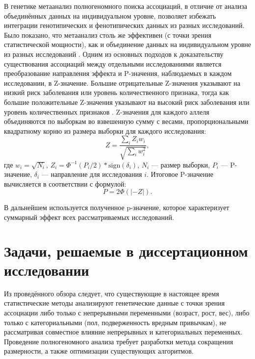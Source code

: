 В генетике метаанализ полногеномного поиска ассоциаций, в отличие от анализа объединённых данных на индивидуальном уровне, позволяет избежать интеграции генотипических и фенотипических данных из разных исследований. Было показано, что метаанализ столь же эффективен (с точки зрения статистической мощности), как и объединение данных на индивидуальном уровне из разных исследований \autocite{Lin2009}. Одним из основных подходов к доказательству существования ассоциаций между отдельными исследованиями является преобразование направления эффекта и P-значения, наблюдаемых в каждом исследовании, в Z-значение. Большие отрицательные Z-значения указывают на низкий риск заболевания или уровень количественного признака, тогда как большие положительные Z-значения указывают на высокий риск заболевания или уровень количественных признаков \autocite{Willer2010}. Z-значения для каждого аллеля объединяются по выборкам во взвешенную сумму с весами, пропорциональными квадратному корню из размера выборки для каждого исследования:
\begin{equation}
\label{eq:metal_z}
Z=\frac{\sum_{i}Z_i w_i}{\sqrt{\sum_{i}w_i^2}},
\end{equation}
где $w_i = \sqrt{N_i}$, $Z_i = \Phi^{-1}\left(P_i/2\right) * \text{sign}(\delta_i)$, $N_i$ --- размер выборки, $P_i$ --- P-значение, $\delta_i$ --- направление для исследования $i$. Итоговое P-значение вычисляется в соответствии с формулой:
\begin{equation}
\label{eq:metal_p}
P = 2\Phi \left(|-Z|\right).
\end{equation}

В дальнейшем используется полученное p-значение, которое характеризует суммарный эффект всех рассматриваемых исследований. 

\section{Задачи, решаемые в диссертационном исследовании}\label{sec:ch1/sec3}

Из проведённого обзора следует, что существующие в настоящее время статистические методы анализируют генетические данные с точки зрения ассоциации либо только с непрерывными переменными (возраст, рост, вес), либо только с категориальными (пол, подверженность вредным привычкам), не рассматривая совместное влияние непрерывных и категориальных переменных. Проведение полногеномного анализа требует разработки метода сокращения размерности, а также оптимизации существующих алгоритмов.

